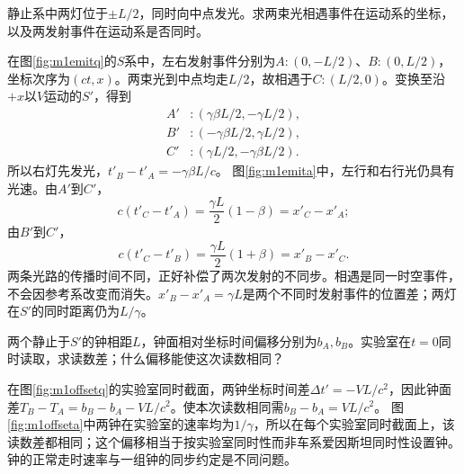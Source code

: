\begin{exercise}\label{ex:m1twoemitters}
静止系中两灯位于$\pm L/2$，同时向中点发光。求两束光相遇事件在运动系的坐标，以及两发射事件在运动系是否同时。
\end{exercise}
\begin{solution}
在图\ref{fig:m1emitq}的$S$系中，左右发射事件分别为$A:(0,-L/2)$、$B:(0,L/2)$，坐标次序为$(ct,x)$。两束光到中点均走$L/2$，故相遇于$C:(L/2,0)$。变换至沿$+x$以$V$运动的$S'$，得到
\begin{align*}
 A'&:(\gamma\beta L/2,-\gamma L/2),\\
 B'&:(-\gamma\beta L/2,\gamma L/2),\\
 C'&:(\gamma L/2,-\gamma\beta L/2).
\end{align*}
所以右灯先发光，$t'_B-t'_A=-\gamma\beta L/c$。
图\ref{fig:m1emita}中，左行和右行光仍具有光速。由$A'$到$C'$，
\[
 c(t'_C-t'_A)=\frac{\gamma L}2(1-\beta)
 =x'_C-x'_A;
\]
由$B'$到$C'$，
\[
 c(t'_C-t'_B)=\frac{\gamma L}2(1+\beta)
 =x'_B-x'_C.
\]
两条光路的传播时间不同，正好补偿了两次发射的不同步。相遇是同一时空事件，不会因参考系改变而消失。$x'_B-x'_A=\gamma L$是两个不同时发射事件的位置差；两灯在$S'$的同时距离仍为$L/\gamma$。
\end{solution}

\begin{exercise}\label{ex:m1clockoffset}
两个静止于$S'$的钟相距$L$，钟面相对坐标时间偏移分别为$b_A,b_B$。实验室在$t=0$同时读取，求读数差；什么偏移能使这次读数相同？
\end{exercise}
\begin{solution}
在图\ref{fig:m1offsetq}的实验室同时截面，两钟坐标时间差$\Delta t'=-VL/c^2$，因此钟面差$T_B-T_A=b_B-b_A-VL/c^2$。使本次读数相同需$b_B-b_A=VL/c^2$。
图\ref{fig:m1offseta}中两钟在实验室的速率均为$1/\gamma$，所以在每个实验室同时截面上，该读数差都相同；这个偏移相当于按实验室同时性而非车系爱因斯坦同时性设置钟。钟的正常走时速率与一组钟的同步约定是不同问题。
\end{solution}

